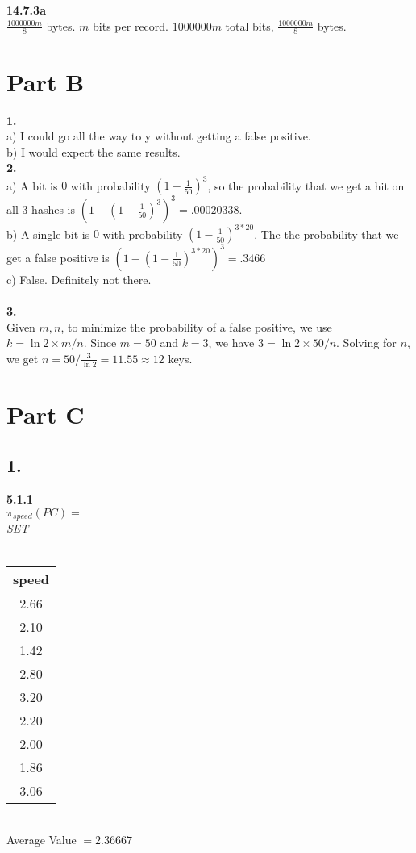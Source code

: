\documentclass[12pt, letterpaper, fleqn]{article}
\begin{document}
  \textbf{14.7.3a}\\
  $\frac{1000000m}{8}$ bytes.
  $m$ bits per record. $1000000m$ total bits, $\frac{1000000m}{8}$ bytes.\\
  
  \section{Part B}
  \textbf{1.}\\
  a) I could go all the way to y without getting a false positive. \\ 
  b) I would expect the same results. \\

  \textbf{2.}\\
  a) A bit is $0$ with probability $(1 - \frac{1}{50})^3$, so the probability
  that we get a hit on all $3$ hashes is $(1 - (1 - \frac{1}{50})^3)^3 =
  .00020338$. \\
  b) A single bit is $0$ with probability $(1 - \frac{1}{50})^{3 * 20}$. The the
  probability that we get a false positive is $(1 - (1 - \frac{1}{50})^{3 *
  20})^3 =.3466 $\\
  c) False. Definitely not there.\\\\

  \textbf{3.}\\
  Given $m,n$, to minimize the probability of a false positive, we use $k = \ln
  2 \times m/n$. Since $m=50$ and $k=3$, we have $3 = \ln 2 \times 50/n$.
  Solving for $n$, we get $n = 50 /\frac{3}{\ln 2} = 11.55 \approx 12$ keys.

  \section{Part C}

  \subsection{1.}
  \textbf{5.1.1} \\
  $\pi_{speed}(PC) = $ \\
  \textit{SET} \\\\
  \begin{tabular} { |c| }
    \hline
    speed\\ \hline
    2.66 \\
    2.10 \\
    1.42 \\
    2.80 \\
    3.20 \\
    2.20 \\
    2.00 \\
    1.86 \\
    3.06  \\
    \hline
  \end{tabular} \\
  Average Value $= 2.36667$ \\\\
\end{document}
